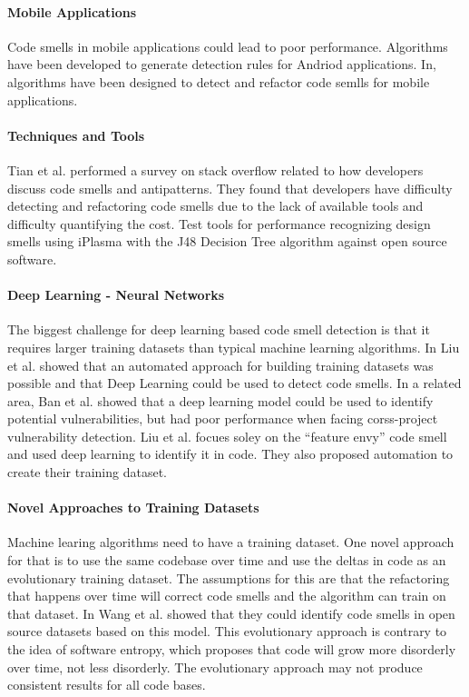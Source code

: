 \documentclass[conference]{IEEEtran}
\begin{document}
\paragraph{Mobile Applications}
Code smells in mobile applications could lead to poor performance. Algorithms have been developed\cite{rubin_sniffing_2019}\cite{ibrahim_reducing_2018} to generate detection rules for Andriod applications. In\cite{ibrahim_reducing_2018}, algorithms have been designed to detect and refactor code semlls for mobile applications.

\paragraph{Techniques and Tools}
Tian et al.\cite{tian_how_2019} performed a survey on stack overflow related to how developers discuss code smells and antipatterns. 
They found that developers have difficulty detecting and refactoring code smells due to the lack of available tools and difficulty quantifying the cost.
Test tools for performance recognizing design smells using iPlasma with the J48 Decision Tree algorithm\cite{singh_systematic_2018} against open source software.

\paragraph{Deep Learning - Neural Networks} The biggest challenge for deep learning based code smell detection\cite{liu_deep_2019} is that it requires larger training datasets than typical machine learning algorithms. In \cite{liu_deep_2019} Liu et al. showed that an automated approach for building training datasets was possible and that Deep Learning could be used to detect code smells.
In a related area, Ban et al. showed that a deep learning model could be used to identify potential vulnerabilities\cite{ban_performance_2019}, but had poor performance when facing corss-project vulnerability detection.
Liu et al. focues soley on the ``feature envy'' code smell and used deep learning to identify it in code. They also proposed automation to create their training dataset.

\paragraph{Novel Approaches to Training Datasets}
Machine learing algorithms need to have a training dataset. One novel approach for that is to use the same codebase over time and use the deltas in code as an evolutionary training dataset\cite{wang_using_2018}. The assumptions for this are that the refactoring that happens over time will correct code smells and the algorithm can train on that dataset. In\cite{wang_using_2018} Wang et al. showed that they could identify code smells in open source datasets based on this model.
This evolutionary approach is contrary to the idea of software entropy\cite{gupta_software_2018}, which proposes that code will grow more disorderly over time, not less disorderly. The evolutionary approach may not produce consistent results for all code bases.
\end{document}
